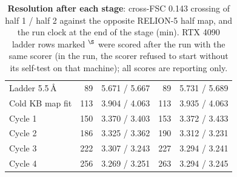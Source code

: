 \begin{table}[t]
\begin{tabular}{@{}lrcrc@{}}
Ladder 5.5\,\AA & 89 & 5.671 / 5.667 & 89 & 5.731 / 5.689 \\
Cold KB map fit & 113 & 3.904 / 4.063 & 113 & 3.935 / 4.063 \\
Cycle 1 & 150 & 3.370 / 3.403 & 153 & 3.372 / 3.433 \\
Cycle 2 & 186 & 3.325 / 3.362 & 190 & 3.312 / 3.231 \\
Cycle 3 & 222 & 3.307 / 3.243 & 227 & 3.294 / 3.241 \\
Cycle 4 & 256 & 3.269 / 3.251 & 263 & 3.294 / 3.245 \\
\bottomrule
\end{tabular}
\caption{\textbf{Resolution after each stage}: cross-FSC 0.143 crossing of half 1 / half 2 against the opposite RELION-5 half map, and the run clock at the end of the stage (min). RTX 4090 ladder rows marked $^\S$ were scored after the run with the same scorer (in the run, the scorer refused to start without its self-test on that machine); all scores are reporting only.}
\label{tab:suppl:resolution}
\end{table}
